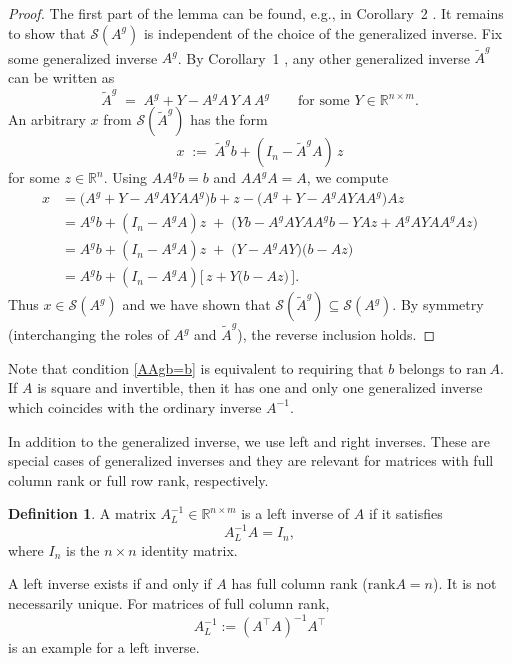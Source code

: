 \documentclass[preprint,12pt]{elsarticle}
\numberwithin{equation}{section}
\theoremstyle{definition}
\newtheorem{definition}[theorem]{Definition}
\begin{document}
\begin{proof}
The first part of the lemma can be found, e.g., in 
Corollary~2 \cite[p.~53]{benisrael2006GeneralizedInverses}.
It remains to show that $\mathcal S(A^g)$ is independent of the choice of the generalized inverse.
Fix some generalized inverse $A^g$. By Corollary~1 \cite[p.~52]{benisrael2006GeneralizedInverses}, any other generalized inverse $\widetilde A^g$ can be written as
\[
\widetilde A^g \;=\; A^g + Y - A^g A\,Y\,A\,A^g
\qquad\text{for some } Y\in\mathbb{R}^{n\times m}.
\]
An arbitrary $x$ from $\mathcal S(\widetilde A^g)$ has the form 
\[
x \;:=\; \widetilde A^g b + (I_n-\widetilde A^g A)\,z
\]
for some $z\in\mathbb{R}^n$. Using $AA^g b=b$ and $AA^gA=A$, we compute
\begin{align*}
x
&= \bigl(A^g + Y - A^g A Y A A^g \bigr)b
   + z - \bigl(A^g + Y - A^g A Y A A^g \bigr)A z\\
&= A^g b + (I_n - A^g A)z \;+\; \bigl( Y b - A^g A Y A A^g b - Y A z + A^g A Y A A^g A z \bigr)\\
&= A^g b + (I_n - A^g A)z \;+\; \bigl( Y - A^g A Y \bigr) \bigl( b - A z \bigr)\\
&= A^g b + (I_n - A^g A)\bigl[\, z + Y\bigl(b-A z\bigr) \,\bigr].
\end{align*}
Thus $x\in\mathcal S(A^g)$
and we have shown that $\mathcal S(\widetilde A^g)\subseteq \mathcal S(A^g)$. By symmetry (interchanging the roles of $A^g$ and $\widetilde A^g$), the reverse inclusion holds. 
\end{proof}


Note that condition \eqref{AAgb=b} is equivalent to requiring that $b$ belongs to $\text{ran}~A$.
If $A$ is square and invertible, then it has one and only one generalized
inverse which coincides with the ordinary inverse $A^{-1}$.





In addition to the generalized inverse, we use left and right inverses. These are special cases of generalized inverses and they are relevant for matrices with full column rank or full row rank, respectively.

\begin{definition}
  A matrix $A_L^{-1}\in\mathbb{R}^{n\times m}$ is a left inverse of $A$ if it satisfies
  \begin{equation*}
      A_L^{-1}A=I_n,
  \end{equation*}
where $I_n$ is the $n\times n$ identity matrix.
\end{definition}
A left inverse exists if and only if $A$ has full column rank ($\text{rank}A=n$).  It is not necessarily unique. For matrices of full column rank, 
\begin{equation}\label{Alina}
A_L^{-1} :=(A^\top A)^{-1}A^\top
\end{equation}
is an example for a left inverse.
\end{document}
